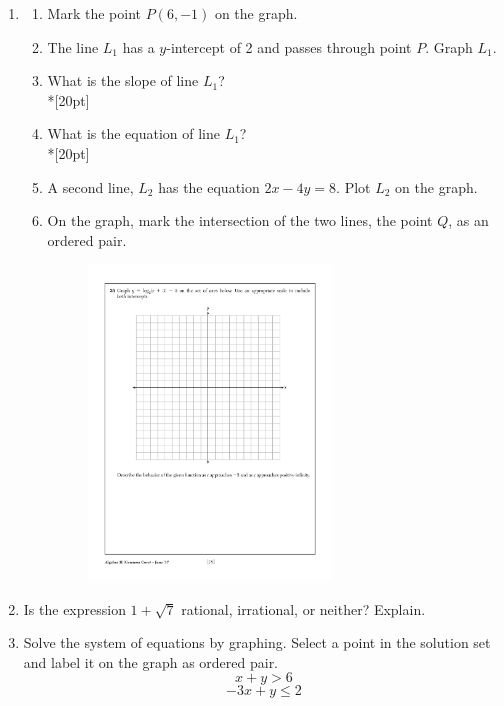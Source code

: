 \documentclass[]{book}
\begin{document}
\begin{enumerate}
\newpage
\item  
\begin{enumerate}
    \item Mark the point $P(6, -1)$ on the graph.
    \item The line $L_1$ has a $y$-intercept of 2 and passes through point $P$. Graph $L_1$.
    \item What is the slope of line $L_1$?\\*[20pt]
    \item What is the equation of line $L_1$?\\*[20pt]
    \item A second line, $L_2$ has the equation $2x-4y=8$. Plot $L_2$ on the graph.
    \item On the graph, mark the intersection of the two lines, the point $Q$, as an ordered pair.

\begin{figure}[!ht]
    \centering
    \includegraphics[width=0.65\textwidth]{regents-grid.pdf}
\end{figure}
\end{enumerate}

\item Is the expression $1+\sqrt{7}$ rational, irrational, or neither? Explain.

\newpage
\item Solve the system of equations by graphing. Select a point in the solution set and label it on the graph as ordered pair.
\[x+y>6\]
\[-3x+y \leq 2\]


\end{enumerate}
\end{document}
